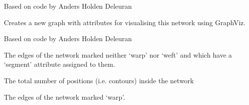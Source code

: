 \documentclass[letterpaper,10pt,english]{sphinxmanual}
\begin{document}
\begin{fulllineitems}
\begin{fulllineitems}
Based on code by Anders Holden Deleuran

\end{fulllineitems}


\begin{fulllineitems}
\label{\detokenize{cockatoo:cockatoo.KnitNetworkBase.prepare_for_graphviz}}
Creates a new graph with attributes for visualising this network
using GraphViz.

Based on code by Anders Holden Deleuran

\end{fulllineitems}


\begin{fulllineitems}
\label{\detokenize{cockatoo:cockatoo.KnitNetworkBase.segment_contour_edges}}
The edges of the network marked neither ‘warp’ nor ‘weft’ and which have a ‘segment’ attribute assigned to them.

\end{fulllineitems}


\begin{fulllineitems}
\label{\detokenize{cockatoo:cockatoo.KnitNetworkBase.total_positions}}
The total number of positions (i.e. contours) inside the network

\end{fulllineitems}


\begin{fulllineitems}
\label{\detokenize{cockatoo:cockatoo.KnitNetworkBase.warp_edges}}
The edges of the network marked ‘warp’.


\end{fulllineitems}
\end{fulllineitems}
\end{document}
